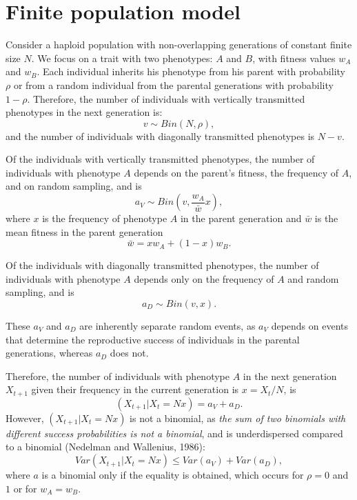 \documentclass[11pt, oneside]{article}   	%
\date{\today}							%
\begin{document}
\section*{Finite population model}

Consider a haploid population with non-overlapping generations of constant finite size $N$.
We focus on a trait with two phenotypes: $A$ and $B$, with fitness values $w_A$ and $w_B$.
Each individual inherits his phenotype from his parent with probability $\rho$ or from a random individual from the parental generations with probability $1-\rho$.
Therefore, the number of individuals with vertically transmitted phenotypes in the next generation is:
\begin{equation}
v \sim Bin(N, \rho),
\end{equation}
and the number of individuals with diagonally transmitted phenotypes is $N-v$.

Of the individuals with vertically transmitted phenotypes, the number of individuals with phenotype $A$ depends on the parent's fitness, the frequency of $A$, and on random sampling, and is 
\begin{equation}
a_V \sim Bin(v, \frac{w_A}{\bar{w}} x),
\end{equation}
where $x$ is the frequency of phenotype $A$ in the parent generation and $\bar{w}$ is the mean fitness in the parent generation
\begin{equation}
\bar{w} = x w_A + (1-x) w_B.
\end{equation}

Of the individuals with diagonally transmitted phenotypes, the number of individuals with phenotype $A$ depends only on the frequency of $A$ and random sampling, and is 
\begin{equation}
a_D \sim Bin(v, x).
\end{equation}

These $a_V$ and $a_D$ are inherently separate random events, as $a_V$ depends on events that determine the reproductive success of individuals in the parental generations, whereas $a_D$ does not.

Therefore, the number of individuals with phenotype $A$ in the next generation $X_{t+1}$ given their frequency in the current generation is $x = X_t/N$, is
\begin{equation}
(X_{t+1}|X_t=Nx) = a_V + a_D.
\end{equation}
However, $(X_{t+1}|X_t=Nx)$ is not a binomial, as \textit{the sum of two binomials with different success probabilities is not a binomial}, and is underdispersed compared to a binomial (Nedelman and Wallenius, 1986):
\begin{equation}
Var(X_{t+1}|X_t=Nx) \le Var(a_V) + Var(a_D),
\end{equation}
where $a$ is a binomial only if the equality is obtained, which occurs for $\rho=0$ and $1$ or for $w_A=w_B$.
\end{document}
